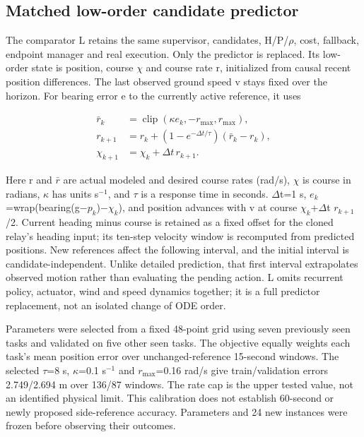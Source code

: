 \documentclass[conference]{IEEEtran}
\begin{document}
\subsection{Matched low-order candidate predictor}

The comparator L retains the same supervisor, candidates, H/P/\ensuremath{\rho}, cost, fallback, endpoint manager and real execution. Only the predictor is replaced. Its low-order state is position, course \ensuremath{\chi} and course rate r, initialized from causal recent position differences. The last observed ground speed v stays fixed over the horizon. For bearing error e to the currently active reference, it uses

\begin{equation}\label{eq:6}
\begin{aligned}\bar r_k&=\operatorname{clip}(\kappa e_k,-r_{\max},r_{\max}),\\r_{k+1}&=r_k+(1-e^{-\Delta t/\tau})(\bar r_k-r_k),\\\chi_{k+1}&=\chi_k+\Delta t\,r_{k+1}.\end{aligned}
\end{equation}

Here r and $\bar r$ are actual modeled and desired course rates (rad/s), \ensuremath{\chi} is course in radians, \ensuremath{\kappa} has units s$^{-1}$, and \ensuremath{\tau} is a response time in seconds. \ensuremath{\Delta}t=1 s, $e_k$=wrap(bearing(g\ensuremath{-}$p_k$)\ensuremath{-}$\chi_k$), and position advances with v at course $\chi_k$+\ensuremath{\Delta}t $r_{k+1}$/2. Current heading minus course is retained as a fixed offset for the cloned relay's heading input; its ten-step velocity window is recomputed from predicted positions. New references affect the following interval, and the initial interval is candidate-independent. Unlike detailed prediction, that first interval extrapolates observed motion rather than evaluating the pending action. L omits recurrent policy, actuator, wind and speed dynamics together; it is a full predictor replacement, not an isolated change of ODE order.

Parameters were selected from a fixed 48-point grid using seven previously seen tasks and validated on five other seen tasks. The objective equally weights each task's mean position error over unchanged-reference 15-second windows. The selected \ensuremath{\tau}=8 s, \ensuremath{\kappa}=0.1 s$^{-1}$ and $r_{\max}$=0.16 rad/s give train/validation errors 2.749/2.694 m over 136/87 windows. The rate cap is the upper tested value, not an identified physical limit. This calibration does not establish 60-second or newly proposed side-reference accuracy. Parameters and 24 new instances were frozen before observing their outcomes.
\end{document}

